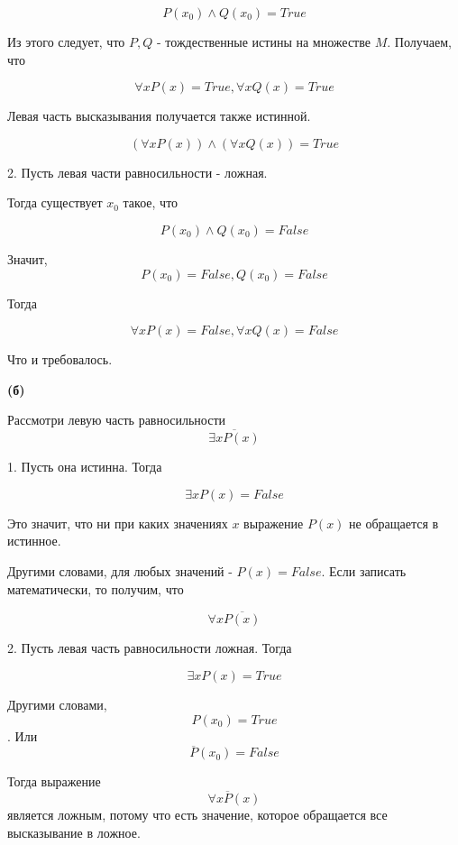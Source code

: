 \documentclass{article}
\begin{document}
$$P(x_0) \wedge Q(x_0) = True$$

Из этого следует, что $P, Q$ - тождественные истины на множестве $M$. Получаем, что 

$$\forall x P(x) = True, \forall x Q(x) = True$$

Левая часть высказывания получается также истинной. 

$$(\forall x P(x)) \wedge (\forall x Q(x)) = True$$

2. Пусть левая части равносильности - ложная.

Тогда существует $x_0$ такое, что 

$$P(x_0) \wedge Q(x_0) = False$$

Значит, 
$$P(x_0) = False, Q(x_0) = False$$

Тогда

$$\forall x P(x) = False, \forall x Q(x) = False$$ 

Что и требовалось.

\textbf{(б)}

Рассмотри левую часть равносильности
$$\overline{ \exists x P ( x ) }  $$

1. Пусть она истинна. Тогда

$$\exists x P(x) = False$$ 

Это значит, что ни при каких значениях $x$ выражение $P(x)$ не обращается в истинное. 

Другими словами, для любых значений - $P(x) = False$. Если записать математически, то получим, что 

$$ \forall x \overline{ P (x) } $$

2. Пусть левая часть равносильности ложная. Тогда 

$$\exists x P(x) = True$$

Другими словами, $$P(x_0) = True$$. Или $$\overline{P} (x_0) = False$$

Тогда выражение 
$$\forall x \overline{P} (x) $$ является ложным, потому что есть значение, которое обращается все высказывание в ложное. 
\end{document}
